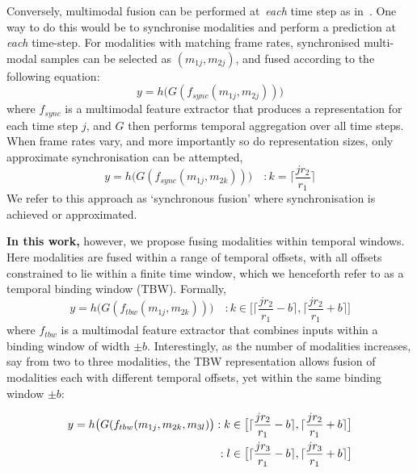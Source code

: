 \documentclass[10pt,twocolumn,letterpaper]{article}
\begin{document}
Conversely, multimodal fusion can be performed at~\textit{each} time step as in~\cite{Feichtenhofer_2016_CVPR}. One way to do this would be to synchronise modalities and perform a prediction at \textit{each} time-step. For modalities with matching frame rates, synchronised multi-modal samples can be selected as $(m_{1j}, m_{2j})$, and fused according to the following equation:
\begin{equation}\label{eq:sync}
    y = h\big(G(f_{sync}(m_{1j}, m_{2j}))\big)
\end{equation}
where $f_{sync}$ is a multimodal feature extractor that produces a representation for each time step $j$, and $G$ then performs temporal aggregation over all time steps. When frame rates vary, and more importantly so do representation sizes,  only approximate synchronisation can be attempted,
\begin{equation} \label{eq:approximate_sync}
    y = h\big(G(f_{sync}(m_{1j}, m_{2k}))\big) \quad: k = \lceil \frac{j r_2} {r_1} \rceil 
\end{equation}
We refer to this approach as `synchronous fusion' where synchronisation is achieved or approximated.

\textbf{In this work,} however, we propose fusing modalities within temporal windows. Here modalities are fused within a range of temporal offsets, with all offsets constrained to lie within a finite time window, which we henceforth refer to as a temporal binding window (TBW). Formally,
\begin{equation}\label{eq:tbw_fusion}
    y = h\big(G( f_{tbw}(m_{1j}, m_{2k}))\big) \quad: k \in \big[\lceil \frac{jr_2}{r_1}-b\rceil, \lceil \frac{jr_2}{r_1}+b\rceil\big]
\end{equation}
where $f_{tbw}$ is a multimodal feature extractor that combines inputs within a binding window of width $\pm b$.
Interestingly, as the number of modalities increases, say from two to three modalities, the TBW representation allows fusion of modalities each with different temporal offsets, yet within the same binding window $\pm b$:

\vspace*{-8pt}
{\footnotesize{
 \begin{align}\label{eq:multimodal_tbw}
    y = h\big(G(f_{tbw}(m_{1j}, m_{2k}, m_{3l})\big)
    : k \in \big[\lceil \frac{jr_2}{r_1}-b\rceil, \lceil \frac{jr_2}{r_1}+b\rceil\big] \nonumber\\
    \vspace*{-4pt}
    : l \in \big[\lceil \frac{jr_3}{r_1}-b\rceil, \lceil \frac{jr_3}{r_1}+b\rceil\big] 
\end{align}}}
\vspace*{-8pt}
\end{document}
